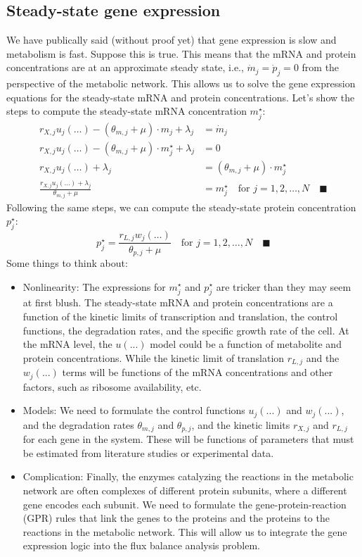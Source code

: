 \documentclass{article}[11pt]
\begin{document}
\subsection{Steady-state gene expression}
We have publically said (without proof yet) that gene expression is slow and metabolism is fast. Suppose this is true.
This means that the mRNA and protein concentrations are at an approximate steady state, i.e., $\dot{m}_{j}=\dot{p}_{j}=0$ from the perspective of the metabolic network. 
This allows us to solve the gene expression equations for the steady-state mRNA and protein concentrations. 
Let's show the steps to compute the steady-state mRNA concentration $m^{\star}_{j}$:
\begin{align*}
r_{X,j}u_{j}\left(\dots\right) - \left(\theta_{m,j}+\mu\right)\cdot{m_{j}}+\lambda_{j} & = \dot{m}_{j}\\
r_{X,j}u_{j}\left(\dots\right) - \left(\theta_{m,j}+\mu\right)\cdot{m^{\star}_{j}}+\lambda_{j} &= 0 \\
r_{X,j}u_{j}\left(\dots\right) + \lambda_{j} & = \left(\theta_{m,j}+\mu\right)\cdot{m^{\star}_{j}}\\
\frac{r_{X,j}u_{j}\left(\dots\right) + \lambda_{j}}{\theta_{m,j}+\mu} &= m^{\star}_{j}\quad\text{for }j=1,2,\dots,N\quad\blacksquare
\end{align*}
Following the same steps, we can compute the steady-state protein concentration $p^{\star}_{j}$:
\begin{equation*}
p^{\star}_{j} = \frac{r_{L,j}w_{j}\left(\dots\right)}{\theta_{p,j}+\mu}\quad\text{for }j=1,2,\dots,N\quad\blacksquare
\end{equation*}
Some things to think about:
\begin{itemize}[leftmargin=16pt]
\item{Nonlinearity: The expressions for $m^{\star}_{j}$ and $p^{\star}_{j}$ are tricker than they may seem at first blush. 
The steady-state mRNA and protein concentrations are a function of the kinetic limits of transcription and translation, the control functions, the degradation rates, and the specific growth rate of the cell. At the mRNA level, the $u(...)$ model could be a function of metabolite and protein concentrations. While the kinetic limit of translation $r_{L,j}$ and the $w_{j}(...)$ terms will be functions of the mRNA concentrations and other factors, 
such as ribosome availability, etc.}
\item{Models: We need to formulate the control functions $u_{j}(...)$ and $w_{j}(...)$, and the degradation rates $\theta_{m,j}$ and $\theta_{p,j}$, and the kinetic limits $r_{X,j}$ and $r_{L,j}$ for each gene in the system. 
These will be functions of parameters that must be estimated from literature studies or experimental data.}
\item{Complication: Finally, the enzymes catalyzing the reactions in the metabolic network are often complexes of different protein subunits, where a different gene encodes each subunit. We need to formulate the gene-protein-reaction (GPR) rules that link the genes to the proteins and the proteins to the reactions in the metabolic network. 
This will allow us to integrate the gene expression logic into the flux balance analysis problem.}
\end{itemize}
\end{document}

